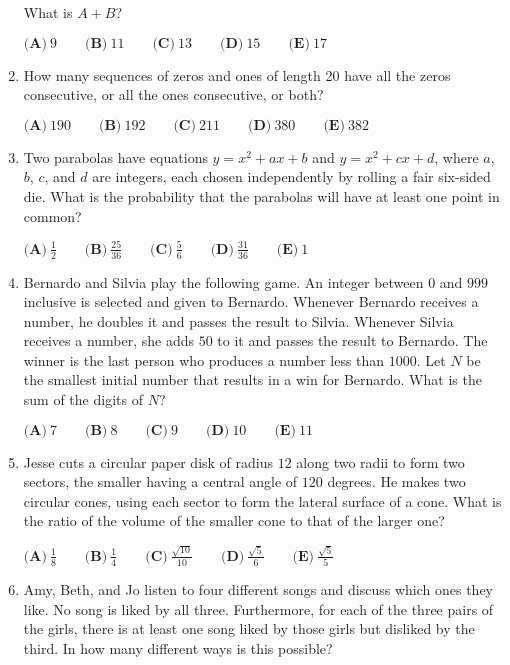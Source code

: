 \documentclass{article}
\begin{document}
\begin{enumerate}[label=\arabic*., itemsep=0.5em]
What is \(A+B\)?

\(\textbf{(A)}\ 9\qquad\textbf{(B)}\ 11\qquad\textbf{(C)}\ 13\qquad\textbf{(D)}\ 15\qquad\textbf{(E)}\ 17 \)\par \vspace{0.5em}\item How many sequences of zeros and ones of length 20 have all the zeros consecutive, or all the ones consecutive, or both?

\(\textbf{(A)}\ 190\qquad\textbf{(B)}\ 192\qquad\textbf{(C)}\ 211\qquad\textbf{(D)}\ 380\qquad\textbf{(E)}\ 382 \)\par \vspace{0.5em}\item Two parabolas have equations \(y= x^2 + ax +b\) and \(y= x^2 + cx +d\), where \(a\), \(b\), \(c\), and \(d\) are integers, each chosen independently by rolling a fair six-sided die. What is the probability that the parabolas will have at least one point in common?

\(\textbf{(A)}\ \frac{1}{2}\qquad\textbf{(B)}\ \frac{25}{36}\qquad\textbf{(C)}\ \frac{5}{6}\qquad\textbf{(D)}\ \frac{31}{36}\qquad\textbf{(E)}\ 1 \)\par \vspace{0.5em}\item Bernardo and Silvia play the following game. An integer between \(0\) and \(999\) inclusive is selected and given to Bernardo. Whenever Bernardo receives a number, he doubles it and passes the result to Silvia. Whenever Silvia receives a number, she adds \(50\) to it and passes the result to Bernardo. The winner is the last person who produces a number less than \(1000\). Let \(N\) be the smallest initial number that results in a win for Bernardo. What is the sum of the digits of \(N\)?

\( \textbf{(A)}\ 7\qquad\textbf{(B)}\ 8\qquad\textbf{(C)}\ 9\qquad\textbf{(D)}\ 10\qquad\textbf{(E)}\ 11 \)\par \vspace{0.5em}\item Jesse cuts a circular paper disk of radius \(12\) along two radii to form two sectors, the smaller having a central angle of \(120\) degrees. He makes two circular cones, using each sector to form the lateral surface of a cone. What is the ratio of the volume of the smaller cone to that of the larger one?

\(\textbf{(A)}\ \frac{1}{8}\qquad\textbf{(B)}\ \frac{1}{4}\qquad\textbf{(C)}\ \frac{\sqrt{10}}{10}\qquad\textbf{(D)}\ \frac{\sqrt{5}}{6}\qquad\textbf{(E)}\ \frac{\sqrt{5}}{5}\)\par \vspace{0.5em}\item Amy, Beth, and Jo listen to four different songs and discuss which ones they like. No song is liked by all three. Furthermore, for each of the three pairs of the girls, there is at least one song liked by those girls but disliked by the third. In how many different ways is this possible?


\end{enumerate}
\end{document}
